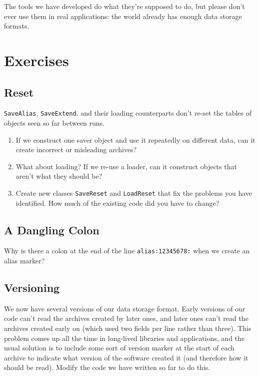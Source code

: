 \documentclass{scrbook}
\begin{document}
The tools we have developed do what they're supposed to do,
but please don't ever use them in real applications:
the world already has enough data storage formats.

\section{Exercises}\label{persistence-exercises}

\subsection*{Reset}


\texttt{SaveAlias}, \texttt{SaveExtend}, and their loading counterparts
don't re-set the tables of objects seen so far between runs.

\begin{enumerate}

\item 

If we construct one saver object and use it repeatedly on different data,
    can it create incorrect or misleading archives?



\item 

What about loading?
    If we re-use a loader,
    can it construct objects that aren't what they should be?



\item 

Create new classes \texttt{SaveReset} and \texttt{LoadReset}
    that fix the problems you have identified.
    How much of the existing code did you have to change?



\end{enumerate}

\subsection*{A Dangling Colon}


Why is there a colon at the end of the line \texttt{alias:12345678:}
when we create an alias marker?

\subsection*{Versioning}


We now have several versions of our data storage format.
Early versions of our code can't read the archives created by later ones,
and later ones can't read the archives created early on
(which used two fields per line rather than three).
This problem comes up all the time in long-lived libraries and applications,
and the usual solution is to include some sort of version marker
at the start of each archive
to indicate what version of the software created it
(and therefore how it should be read).
Modify the code we have written so far to do this.
\end{document}

